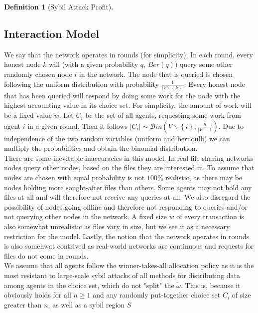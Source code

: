 \documentclass[11pt,a4paper]{report}
\theoremstyle{definition}
\newtheorem{definition}{Definition}[section]
\theoremstyle{theorem}
\theoremstyle{proposition}
\theoremstyle{corollary}
\theoremstyle{lemma}
\theoremstyle{example}
\theoremstyle{remark}
\begin{document}
\begin{definition}[Sybil Attack Profit]
\subsection{Interaction Model}
\label{subsec:Interaction Model}
\noindent{}We say that the network operates in rounds (for simplicity). In each round, every honest node $k$ will (with a given probability $q$, $Ber(q)$) query some other randomly chosen node $i$ in the network. The node that is queried is chosen following the uniform distribution with probability $\frac{1}{|V\backslash\left\lbrace{}k\right\rbrace{}|}$. Every honest node that has been queried will respond by doing some work for the node with the highest accounting value in its choice set. For simplicity, the amount of work will be a fixed value $\tilde{w}$. Let $C_i$ be the set of all agents, requesting some work from agent $i$ in a given round. Then it follows $|C_i|\sim\mathcal{B}in(V\backslash\left\lbrace{}i\right\rbrace{},\frac{q}{|V|-1})$. Due to independence of the two random variables (uniform and bernoulli) we can multiply the probabilities and obtain the binomial distribution. \vspace{1em}\\

\noindent{}There are some inevitable inaccuracies in this model. In real file-sharing networks nodes query other nodes, based on the files they are interested in. To assume that nodes are chosen with equal probability is not $100\%$ realistic, as there may be nodes holding more sought-after files than others. Some agents may not hold any files at all and will therefore not receive any queries at all. We also disregard the possibility of nodes going offline and therefore not responding to queries and/or not querying other nodes in the network. A fixed size $\tilde{w}$ of every transaction is also somewhat unrealistic as files vary in size, but we see it as a necessary restriction for the model. Lastly, the notion that the network operates in rounds is also somehwat contrived as real-world networks are continuous and requests for files do not come in rounds. \vspace{1em}\\

\noindent{}We assume that all agents follow the winner-takes-all allocation policy as it is the most resistant to large-scale sybil attacks of all methods for distributing data among agents in the choice set, which do not "split" the $\tilde{\omega}$. This is, because it obviously holds for all $n\geq{}1$ and any randomly put-together choice set $C_i$ of size greater than $n$, as well as a sybil region $S$


\end{definition}
\end{document}
